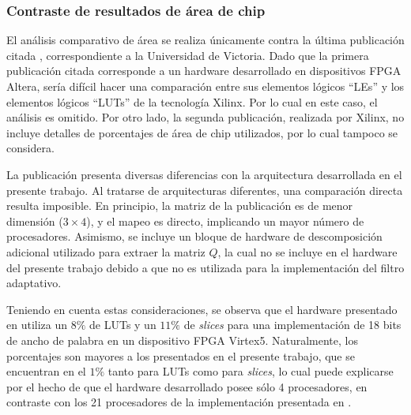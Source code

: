 \newpage

\subsubsection{Contraste de resultados de área de chip}

El análisis comparativo de área se realiza únicamente contra la última publicación citada \cite{DongdongQR}, correspondiente a la Universidad de Victoria. Dado que la primera publicación citada corresponde a un hardware desarrollado en dispositivos FPGA Altera, sería difícil hacer una comparación entre sus elementos lógicos ``LEs'' y los elementos lógicos ``LUTs'' de la tecnología Xilinx. Por lo cual en este caso, el análisis es omitido. Por otro lado, la segunda publicación, realizada por Xilinx, no incluye detalles de porcentajes de área de chip utilizados, por lo cual tampoco se considera.

La publicación \cite{DongdongQR} presenta diversas diferencias con la arquitectura desarrollada en el presente trabajo. Al tratarse de arquitecturas diferentes, una comparación directa resulta imposible. En principio, la matriz de la publicación es de menor dimensión ($3 \times 4$), y el mapeo es directo, implicando un mayor número de procesadores. Asimismo, se incluye un bloque de hardware de descomposición adicional utilizado para extraer la matriz $Q$, la cual no se incluye en el hardware del presente trabajo debido a que no es utilizada para la implementación del filtro adaptativo.

Teniendo en cuenta estas consideraciones, se observa que el hardware presentado en \cite{DongdongQR} utiliza un $8\%$ de LUTs y un $11\%$ de \textit{slices} para una implementación de 18 bits de ancho de palabra en un dispositivo FPGA Virtex5. Naturalmente, los porcentajes son mayores a los presentados en el presente trabajo, que se encuentran en el $1\%$ tanto para LUTs como para \textit{slices}, lo cual puede explicarse por el hecho de que el hardware desarrollado posee sólo 4 procesadores, en contraste con los 21 procesadores de la implementación presentada en \cite{DongdongQR}.